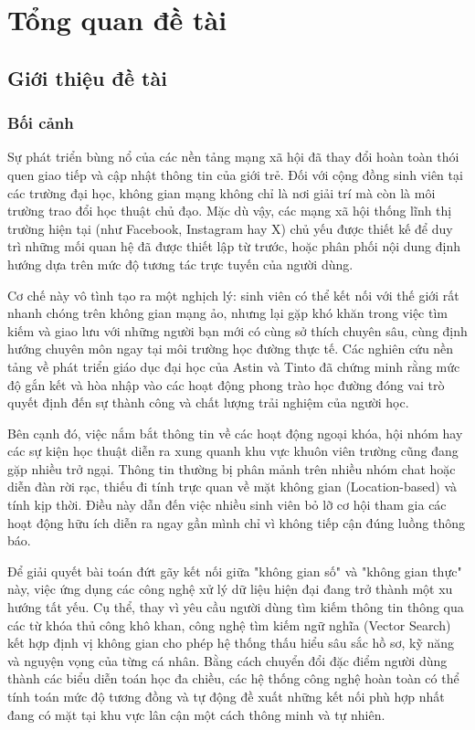 \chapter{Tổng quan đề tài}
\section{Giới thiệu đề tài}
\subsection{Bối cảnh}

Sự phát triển bùng nổ của các nền tảng mạng xã hội đã thay đổi hoàn toàn thói quen giao tiếp và cập nhật thông tin của giới trẻ. Đối với cộng đồng sinh viên tại các trường đại học, không gian mạng không chỉ là nơi giải trí mà còn là môi trường trao đổi học thuật chủ đạo. Mặc dù vậy, các mạng xã hội thống lĩnh thị trường hiện tại (như Facebook, Instagram hay X) chủ yếu được thiết kế để duy trì những mối quan hệ đã được thiết lập từ trước, hoặc phân phối nội dung định hướng dựa trên mức độ tương tác trực tuyến của người dùng\cite{tac-dong-cua-mang-xa-hoi, manca2020snss}.

Cơ chế này vô tình tạo ra một nghịch lý: sinh viên có thể kết nối với thế giới rất nhanh chóng trên không gian mạng ảo, nhưng lại gặp khó khăn trong việc tìm kiếm và giao lưu với những người bạn mới có cùng sở thích chuyên sâu, cùng định hướng chuyên môn ngay tại môi trường học đường thực tế. Các nghiên cứu nền tảng về phát triển giáo dục đại học của Astin\cite{astin1984involvement} và Tinto\cite{tinto1993leaving} đã chứng minh rằng mức độ gắn kết và hòa nhập vào các hoạt động phong trào học đường đóng vai trò quyết định đến sự thành công và chất lượng trải nghiệm của người học.

Bên cạnh đó, việc nắm bắt thông tin về các hoạt động ngoại khóa, hội nhóm hay các sự kiện học thuật diễn ra xung quanh khu vực khuôn viên trường cũng đang gặp nhiều trở ngại. Thông tin thường bị phân mảnh trên nhiều nhóm chat hoặc diễn đàn rời rạc, thiếu đi tính trực quan về mặt không gian (Location-based) và tính kịp thời. Điều này dẫn đến việc nhiều sinh viên bỏ lỡ cơ hội tham gia các hoạt động hữu ích diễn ra ngay gần mình chỉ vì không tiếp cận đúng luồng thông báo.\cite{bao2015recommendations}

Để giải quyết bài toán đứt gãy kết nối giữa "không gian số" và "không gian thực" này, việc ứng dụng các công nghệ xử lý dữ liệu hiện đại đang trở thành một xu hướng tất yếu. Cụ thể, thay vì yêu cầu người dùng tìm kiếm thông tin thông qua các từ khóa thủ công khô khan, công nghệ tìm kiếm ngữ nghĩa (Vector Search) kết hợp định vị không gian cho phép hệ thống thấu hiểu sâu sắc hồ sơ, kỹ năng và nguyện vọng của từng cá nhân\cite{johnson2021billion}. Bằng cách chuyển đổi đặc điểm người dùng thành các biểu diễn toán học đa chiều, các hệ thống công nghệ hoàn toàn có thể tính toán mức độ tương đồng và tự động đề xuất những kết nối phù hợp nhất đang có mặt tại khu vực lân cận một cách thông minh và tự nhiên\cite{chandar2020using}.

